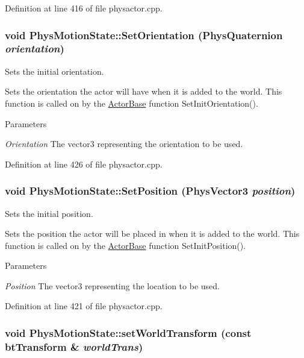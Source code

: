 Definition at line 416 of file physactor.cpp.

\hypertarget{classPhysMotionState_a1f8510490f7b4dfb0c85f4ffb6823305}{
\subsubsection[{SetOrientation}]{\setlength{\rightskip}{0pt plus 5cm}void PhysMotionState::SetOrientation ({\bf PhysQuaternion} {\em orientation})}}
\label{d2/d14/classPhysMotionState_a1f8510490f7b4dfb0c85f4ffb6823305}


Sets the initial orientation. 

Sets the orientation the actor will have when it is added to the world. This function is called on by the \hyperlink{classActorBase}{ActorBase} function SetInitOrientation(). 
\begin{DoxyParams}{Parameters}
\item[{\em Orientation}]The vector3 representing the orientation to be used. \end{DoxyParams}


Definition at line 426 of file physactor.cpp.

\hypertarget{classPhysMotionState_aa2fa4f107147626cd33d42fd3fbe178b}{
\subsubsection[{SetPosition}]{\setlength{\rightskip}{0pt plus 5cm}void PhysMotionState::SetPosition ({\bf PhysVector3} {\em position})}}
\label{d2/d14/classPhysMotionState_aa2fa4f107147626cd33d42fd3fbe178b}


Sets the initial position. 

Sets the position the actor will be placed in when it is added to the world. This function is called on by the \hyperlink{classActorBase}{ActorBase} function SetInitPosition(). 
\begin{DoxyParams}{Parameters}
\item[{\em Position}]The vector3 representing the location to be used. \end{DoxyParams}


Definition at line 421 of file physactor.cpp.

\hypertarget{classPhysMotionState_a57c23b922e2c5e8af87dc1318796ec8b}{
\subsubsection[{setWorldTransform}]{\setlength{\rightskip}{0pt plus 5cm}void PhysMotionState::setWorldTransform (const btTransform \& {\em worldTrans})}}
\label{d2/d14/classPhysMotionState_a57c23b922e2c5e8af87dc1318796ec8b}



